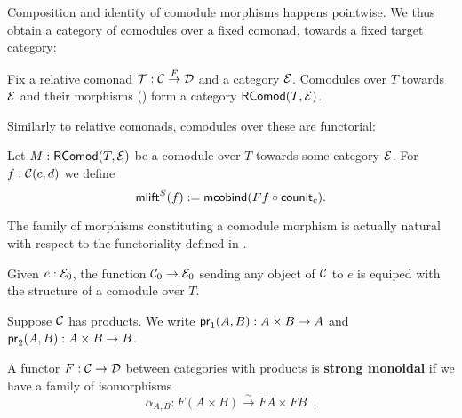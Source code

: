 \documentclass{amsart}
\newcommand{\fat}[1]{\textbf{#1}}
\begin{document}
Composition and identity of comodule morphisms happens pointwise. We thus obtain a category of comodules
over a fixed comonad, towards a fixed target category:

\begin{remark}
 Fix a relative comonad $\T : \C\stackrel{F}{\to}\D$ and a category $\E$.
 Comodules over $T$ towards $\E$ and their morphisms () form a category $\RComod(T,\E)$.
\end{remark}

Similarly to relative comonads, comodules over these are functorial:

\begin{definition}\label{def:comodule_lift}
 Let $M : \RComod(T,\E)$ be a comodule over $T$ towards some category $\E$. For $f : \C(c,d)$ we define
  \[ \mlift^S(f) := \mcobind(\comp{\counit_c}{Ff}) .  \]
\end{definition}


\begin{remark}
  The family of morphisms constituting a comodule morphism is actually natural with respect to the functoriality 
  defined in .
\end{remark}


\begin{definition}
  Given $e:\E_0$, the function $\C_0\to\E_0$ sending any object of $\C$ to $e$ is equiped with
  the structure of a comodule over $T$.
\end{definition}




\begin{remark}[Notation]
 Suppose $\C$ has products. We write $\pr_1(A,B) : A\times B \to A$ and $\pr_2(A,B) : A\times B \to B$.
\end{remark}

\begin{definition}
 A functor $F:\C\to\D$ between categories with products is \fat{strong monoidal} if we have a family of isomorphisms
  \[ \alpha_{A,B} : F(A\times B) \stackrel{\sim}{\to} FA\times FB\enspace . \] 
\end{definition}
\end{document}
